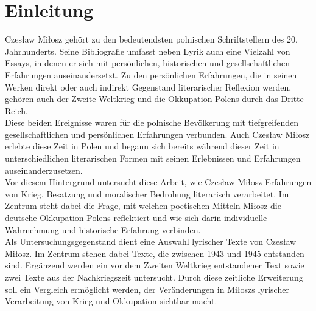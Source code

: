 
\section{Einleitung}
\onehalfspacing

Czesław Miłosz gehört zu den bedeutendsten polnischen Schriftstellern des 20. Jahrhunderts. Seine Bibliografie umfasst neben Lyrik auch eine Vielzahl von Essays, in denen er sich mit persönlichen, historischen und gesellschaftlichen Erfahrungen auseinandersetzt. Zu den persönlichen Erfahrungen, die in seinen Werken direkt oder auch indirekt Gegenstand literarischer Reflexion werden, gehören auch der Zweite Weltkrieg und die Okkupation Polens durch das Dritte Reich.
\\[6pt]
Diese beiden Ereignisse waren für die polnische Bevölkerung mit tiefgreifenden gesellschaftlichen und persönlichen Erfahrungen verbunden. Auch Czesław Miłosz erlebte diese Zeit in Polen und begann sich bereits während dieser Zeit in unterschiedlichen literarischen Formen mit seinen Erlebnissen und Erfahrungen auseinanderzusetzen.
\\[6pt]
Vor diesem Hintergrund untersucht diese Arbeit, wie Czesław Miłosz Erfahrungen von Krieg, Besatzung und moralischer Bedrohung literarisch verarbeitet. Im Zentrum steht dabei die Frage, mit welchen poetischen Mitteln Miłosz die deutsche Okkupation Polens reflektiert und wie sich darin individuelle Wahrnehmung und historische Erfahrung verbinden.
\\[6pt]
Als Untersuchungsgegenstand dient eine Auswahl lyrischer Texte von Czesław Miłosz. Im Zentrum stehen dabei Texte, die zwischen 1943 und 1945 entstanden sind. Ergänzend werden ein vor dem Zweiten Weltkrieg entstandener Text sowie zwei Texte aus der Nachkriegszeit untersucht. Durch diese zeitliche Erweiterung soll ein Vergleich ermöglicht werden, der Veränderungen in Miłoszs lyrischer Verarbeitung von Krieg und Okkupation sichtbar macht.